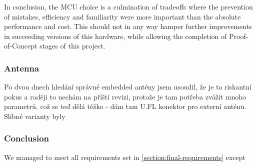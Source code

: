 In conclusion, the MCU choice is a culmination of tradeoffs where the prevention of mistakes, efficiency and familiarity were more important than the absolute performance and cost. This should not in any way hamper further improvements in succeeding versions of this hardware, while allowing the completion of Proof-of-Concept stages of this project. 

\subsubsection{Antenna}
Po dvou dnech hledání správné embedded antény jsem usoudil, že je to riskantní pokus a raději to nechám na příští revizi, protože je tam potřeba zvážit mnoho parametrů, což se teď dělá těžko - dám tam U.FL konektor pro externí anténu. Slibné varianty byly

\subsubsection{Conclusion}
We managed to meet all requirements set in \ref{section:final-requirements} except

